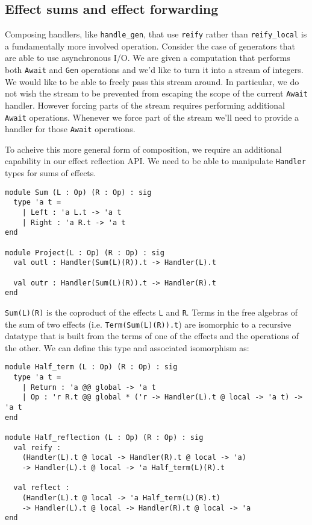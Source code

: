 \documentclass[acmsmall, screen, nonacm]{acmart}
\theoremstyle{definition}
\begin{document}
\subsection{Effect sums and effect forwarding}

Composing handlers, like \lstinline[style=oxcaml]{handle_gen}, that use
\lstinline[style=oxcaml]{reify} rather than
\lstinline[style=oxcaml]{reify_local} is a fundamentally more involved
operation. Consider the case of generators that are able to use
asynchronous I/O. We are given a computation that performs both
\lstinline[style=oxcaml]{Await} and \lstinline[style=oxcaml]{Gen}
operations and we'd like to turn it into a stream of integers.  We would
like to be able to freely pass this stream around. In particular, we do
not wish the stream to be prevented from escaping the scope of the
current \lstinline[style=oxcaml]{Await} handler.  However forcing parts
of the stream requires performing additional
\lstinline[style=oxcaml]{Await} operations. Whenever we force part of the
stream we'll need to provide a handler for those
\lstinline[style=oxcaml]{Await} operations.

To acheive this more general form of composition, we require an
additional capability in our effect reflection API. We need to be able
to manipulate \lstinline[style=oxcaml]{Handler} types for sums of
effects.
\begin{lstlisting}[style=oxcaml]
module Sum (L : Op) (R : Op) : sig
  type 'a t =
    | Left : 'a L.t -> 'a t
    | Right : 'a R.t -> 'a t
end

module Project(L : Op) (R : Op) : sig
  val outl : Handler(Sum(L)(R)).t -> Handler(L).t

  val outr : Handler(Sum(L)(R)).t -> Handler(R).t
end
\end{lstlisting}

\lstinline[style=oxcaml]{Sum(L)(R)} is the coproduct of the effects
\lstinline[style=oxcaml]{L} and \lstinline[style=oxcaml]{R}. Terms in
the free algebras of the sum of two effects
(i.e. \lstinline[style=oxcaml]{Term(Sum(L)(R)).t}) are isomorphic to a
recursive datatype that is built from the terms of one of the effects
and the operations of the other\cite{hyland2006combining}. We can define
this type and associated isomorphism as:
\begin{lstlisting}[style=oxcaml]
module Half_term (L : Op) (R : Op) : sig
  type 'a t =
    | Return : 'a @@ global -> 'a t
    | Op : 'r R.t @@ global * ('r -> Handler(L).t @ local -> 'a t) -> 'a t
end

module Half_reflection (L : Op) (R : Op) : sig
  val reify :
    (Handler(L).t @ local -> Handler(R).t @ local -> 'a)
    -> Handler(L).t @ local -> 'a Half_term(L)(R).t

  val reflect :
    (Handler(L).t @ local -> 'a Half_term(L)(R).t)
    -> Handler(L).t @ local -> Handler(R).t @ local -> 'a
end
\end{lstlisting}
\end{document}
